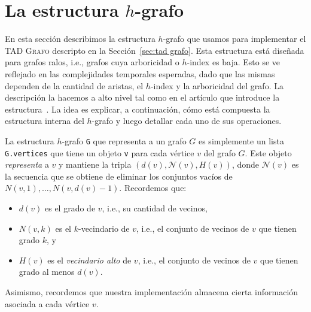 \documentclass[%
    a4paper,%
    fontsize=12pt,%
    DIV=12,
    twoside,%
    openright,%
    titlepage=true,%
    headsepline,%
    toc=bibliography,%
    parskip=half,%
    cleardoublepage=empty,%
    headings=big,%
]{scrbook}
\makeatletter
\newcommand{\Grafo}{\textsc{Grafo}\xspace}
\newcommand{\Code}[2][]{\lstinline[basicstyle={\ttfamily},#1]@#2@}
\newcommand{\N}{\mathcal{N}}
\makeatother
\begin{document}
\chapter{La estructura \texorpdfstring{$h$}{h}-grafo}
\label{sec:h-grafo}

En esta sección describimos la estructura $h$-grafo que usamos para implementar el TAD \Grafo descripto en la Sección~\ref{sec:tad grafo}.  Esta estructura está diseñada para grafos ralos, i.e., grafos cuya arboricidad o $h$-index es baja.  Esto se ve reflejado en  las complejidades temporales esperadas, dado que las mismas dependen de la cantidad de aristas, el $h$-index y la arboricidad del grafo.  La descripción la hacemos a alto nivel tal como en el artículo que introduce la estructura~\cite{LinSoulignacSzwarcfiterTCS2012}.  La idea es explicar, a continuación, cómo está compuesta la estructura interna del $h$-grafo y luego detallar cada uno de sus operaciones.


La estructura $h$-grafo \Code{G} que representa a un grafo $G$ es simplemente un lista \Code{G.vertices} que tiene un objeto \Code{v} para cada vértice $v$ del grafo $G$.  Este objeto \emph{representa} a $v$ y mantiene la tripla $(d(v), \N(v), H(v))$, donde $\N(v)$ es la secuencia que se obtiene de eliminar los conjuntos vacíos de $N(v,1), \ldots, N(v, d(v)-1)$.  Recordemos que:   
\begin{itemize}
\item $d(v)$ es el grado de $v$, i.e., su cantidad de vecinos,
\item $N(v,k)$ es el $k$-vecindario de $v$, i.e., el conjunto de vecinos de $v$ que tienen grado $k$, y
\item $H(v)$ es el \emph{vecindario alto} de $v$, i.e., el conjunto de vecinos de $v$ que tienen grado al menos $d(v)$.
\end{itemize}
Asimismo, recordemos que nuestra implementación almacena cierta información asociada a cada vértice $v$.
\end{document}
